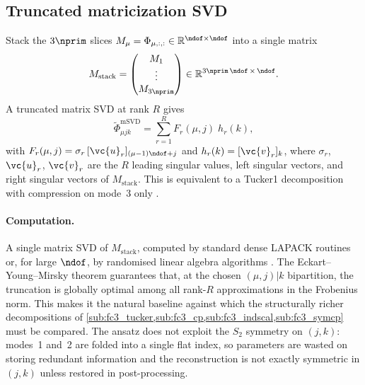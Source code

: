 \subsection{Truncated matricization SVD}
\label{sub:fc3_matsvd}
Stack the $3\nprim$ slices $M_\mu = \Phi_{\mu,:,:}\in\mathbb{R}^{\ndof\times\ndof}$
into a single matrix
\begin{equation}\label{eq:fc3_matsvd_stack}
  M_{\mathrm{stack}}
  = \begin{pmatrix} M_1 \\ \vdots \\ M_{3\nprim} \end{pmatrix}
  \in \mathbb{R}^{3\nprim\,\ndof \,\times\, \ndof}.
\end{equation}
A truncated matrix SVD at rank $R$ gives
\begin{equation}\label{eq:fc3_matsvd_ansatz}
    \tilde\Phi_{\mu j k}^{\mathrm{mSVD}}
    = \sum_{r=1}^{R} F_r(\mu,j)\; h_r(k),
\end{equation}
with $F_r(\mu,j) = \sigma_r\,[\vc{u}_r]_{(\mu-1)\ndof+j}$ and $h_r(k)=[\vc{v}_r]_k$, where
$\sigma_r$, $\vc{u}_r$, $\vc{v}_r$ are the $R$ leading singular values, left singular vectors,
and right singular vectors of $M_{\mathrm{stack}}$. This is equivalent to a Tucker1 decomposition
with compression on mode~3 only \cite[\S4]{kolda_tensor_2009}.

\paragraph{Computation.} A single matrix SVD of $M_{\mathrm{stack}}$, computed by
standard dense LAPACK routines or, for large $\ndof$, by randomised linear algebra algorithms
\cite{halko_finding_2010}. The Eckart--Young--Mirsky theorem
\cite{eckart_approximation_1936, mirsky_symmetric_1960} guarantees that, at the chosen $(\mu,j)|k$ bipartition,
the truncation is globally optimal among all rank-$R$ approximations in the Frobenius norm.
This makes it the natural baseline against which the structurally richer decompositions of
\cref{sub:fc3_tucker,sub:fc3_cp,sub:fc3_indscal,sub:fc3_symcp} must be compared. The ansatz does
not exploit the $S_2$ symmetry on $(j,k)$: modes~1 and~2 are folded into a single flat index, so
parameters are wasted on storing redundant information and the reconstruction is not exactly
symmetric in $(j,k)$ unless restored in post-processing.

